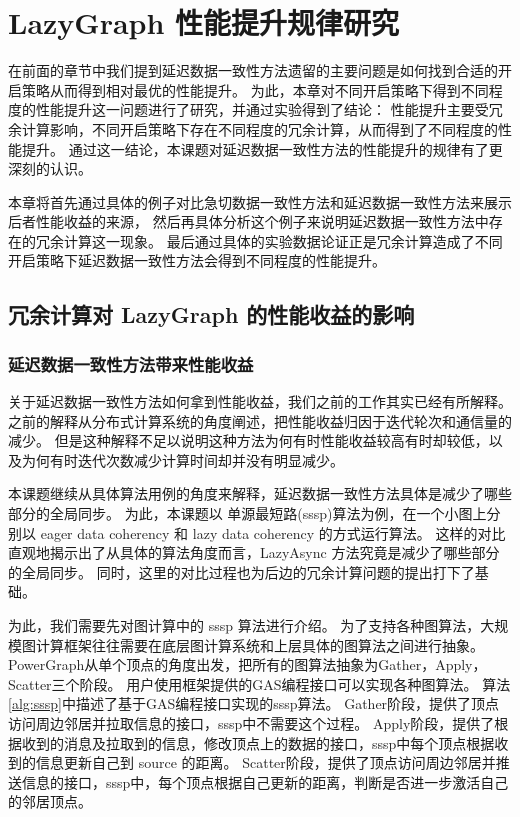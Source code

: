 

\chapter{LazyGraph 性能提升规律研究}
在前面的章节中我们提到延迟数据一致性方法遗留的主要问题是如何找到合适的开启策略从而得到相对最优的性能提升。
为此，本章对不同开启策略下得到不同程度的性能提升这一问题进行了研究，并通过实验得到了结论：
性能提升主要受冗余计算影响，不同开启策略下存在不同程度的冗余计算，从而得到了不同程度的性能提升。
通过这一结论，本课题对延迟数据一致性方法的性能提升的规律有了更深刻的认识。

本章将首先通过具体的例子对比急切数据一致性方法和延迟数据一致性方法来展示后者性能收益的来源，
然后再具体分析这个例子来说明延迟数据一致性方法中存在的冗余计算这一现象。
最后通过具体的实验数据论证正是冗余计算造成了不同开启策略下延迟数据一致性方法会得到不同程度的性能提升。



\section{冗余计算对 LazyGraph 的性能收益的影响}
\subsection{延迟数据一致性方法带来性能收益}
关于延迟数据一致性方法如何拿到性能收益，我们之前的工作其实已经有所解释。
之前的解释从分布式计算系统的角度阐述，把性能收益归因于迭代轮次和通信量的减少。
但是这种解释不足以说明这种方法为何有时性能收益较高有时却较低，以及为何有时迭代次数减少计算时间却并没有明显减少。


本课题继续从具体算法用例的角度来解释，延迟数据一致性方法具体是减少了哪些部分的全局同步。
为此，本课题以 单源最短路(sssp)算法为例，在一个小图上分别以 eager data coherency 和 lazy data coherency 的方式运行算法。
这样的对比直观地揭示出了从具体的算法角度而言，LazyAsync 方法究竟是减少了哪些部分的全局同步。
同时，这里的对比过程也为后边的冗余计算问题的提出打下了基础。


为此，我们需要先对图计算中的 sssp 算法进行介绍。
为了支持各种图算法，大规模图计算框架往往需要在底层图计算系统和上层具体的图算法之间进行抽象。
PowerGraph从单个顶点的角度出发\cite{McCune@CS15}，把所有的图算法抽象为Gather，Apply，Scatter三个阶段。
用户使用框架提供的GAS编程接口可以实现各种图算法。
算法\ref{alg:sssp}中描述了基于GAS编程接口实现的sssp算法。
Gather阶段，提供了顶点访问周边邻居并拉取信息的接口，sssp中不需要这个过程。
Apply阶段，提供了根据收到的消息及拉取到的信息，修改顶点上的数据的接口，sssp中每个顶点根据收到的信息更新自己到 source 的距离。
Scatter阶段，提供了顶点访问周边邻居并推送信息的接口，sssp中，每个顶点根据自己更新的距离，判断是否进一步激活自己的邻居顶点。


